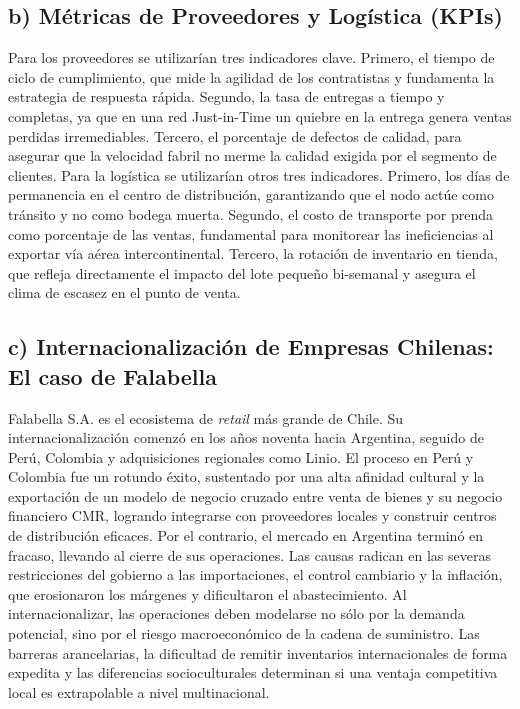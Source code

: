 \documentclass[11pt,a4paper]{article}
\begin{document}
\subsection*{b) Métricas de Proveedores y Logística (KPIs)}
Para los proveedores se utilizarían tres indicadores clave. Primero, el tiempo de ciclo de cumplimiento, que mide la agilidad de los contratistas y fundamenta la estrategia de respuesta rápida. Segundo, la tasa de entregas a tiempo y completas, ya que en una red Just-in-Time un quiebre en la entrega genera ventas perdidas irremediables. Tercero, el porcentaje de defectos de calidad, para asegurar que la velocidad fabril no merme la calidad exigida por el segmento de clientes.
Para la logística se utilizarían otros tres indicadores. Primero, los días de permanencia en el centro de distribución, garantizando que el nodo actúe como tránsito y no como bodega muerta. Segundo, el costo de transporte por prenda como porcentaje de las ventas, fundamental para monitorear las ineficiencias al exportar vía aérea intercontinental. Tercero, la rotación de inventario en tienda, que refleja directamente el impacto del lote pequeño bi-semanal y asegura el clima de escasez en el punto de venta.

\subsection*{c) Internacionalización de Empresas Chilenas: El caso de Falabella}
Falabella S.A. es el ecosistema de \textit{retail} más grande de Chile. Su internacionalización comenzó en los años noventa hacia Argentina, seguido de Perú, Colombia y adquisiciones regionales como Linio.
El proceso en Perú y Colombia fue un rotundo éxito, sustentado por una alta afinidad cultural y la exportación de un modelo de negocio cruzado entre venta de bienes y su negocio financiero CMR, logrando integrarse con proveedores locales y construir centros de distribución eficaces. 
Por el contrario, el mercado en Argentina terminó en fracaso, llevando al cierre de sus operaciones. Las causas radican en las severas restricciones del gobierno a las importaciones, el control cambiario y la inflación, que erosionaron los márgenes y dificultaron el abastecimiento.
Al internacionalizar, las operaciones deben modelarse no sólo por la demanda potencial, sino por el riesgo macroeconómico de la cadena de suministro. Las barreras arancelarias, la dificultad de remitir inventarios internacionales de forma expedita y las diferencias socioculturales determinan si una ventaja competitiva local es extrapolable a nivel multinacional.
\end{document}
